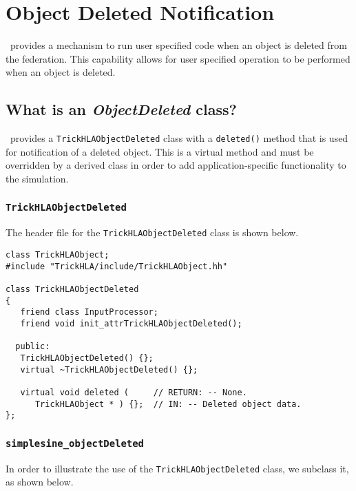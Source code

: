 \chapter{Object Deleted Notification}
\label{sec:hla-objDel}

\TrickHLA\ provides a mechanism to run user specified code when an object is 
deleted from the federation. This capability allows for user specified 
operation to be performed when an object is deleted.

\section{What is an {\em ObjectDeleted} class?}

\TrickHLA\ provides a {\tt TrickHLAObjectDeleted} class with a {\tt deleted()} 
method that is used for notification of a deleted object. This is a virtual 
method and must be overridden by a derived class in order to add 
application-specific functionality to the simulation.

\subsection{{\tt TrickHLAObjectDeleted}}

The header file for the {\tt TrickHLAObjectDeleted} class is shown below.

\begin{lstlisting}[caption={{\tt TrickHLAObjectDeleted} class header}]
class TrickHLAObject;
#include "TrickHLA/include/TrickHLAObject.hh"

class TrickHLAObjectDeleted
{
   friend class InputProcessor;
   friend void init_attrTrickHLAObjectDeleted();

  public:
   TrickHLAObjectDeleted() {};
   virtual ~TrickHLAObjectDeleted() {};

   virtual void deleted (     // RETURN: -- None.
      TrickHLAObject * ) {};  // IN: -- Deleted object data.
};
\end{lstlisting}

\subsection{{\tt simplesine\_objectDeleted}}

In order to illustrate the use of the {\tt TrickHLAObjectDeleted} class, we 
subclass it, as shown below.

